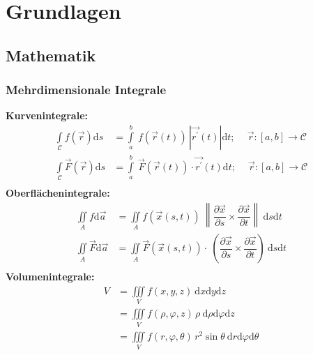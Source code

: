 		\begin{minipage}{.3\paperheight}
			\maketitle
			\tableofcontents
		\end{minipage}
		\section{Grundlagen}
		\subsection{Mathematik}
		\subsubsection{Mehrdimensionale Integrale}
		\begin{center}
			\textbf{Kurvenintegrale:}\\%
			\begin{align*}
				\int\limits_{\mathcal{C}}f(\vec{r})\mathrm{d}s &= \int\limits_a^b\ f(\vec{r}(t))\,|\vec{r^{\prime}}(t)|\mathrm{d}t;\
				\quad \vec{r}:[a,b]\to\mathcal{C}\\
				\int\limits_{\mathcal{C}}\vec{F}(\vec{r})\mathrm{d}s &= \int\limits_a^b\ \vec{F}(\vec{r}(t))\cdot\vec{r^{\prime}}(t)\mathrm{d}t;\
				\quad \vec{r}:[a,b]\to\mathcal{C}\\
			\end{align*}
			\textbf{Oberflächenintegrale:}
			\begin{align*}
				\iint\limits_A f \mathrm{d}\vec{a} &= \iint\limits_A f(\vec{x}(s,t))\!\
				\left\|\dfrac{\partial\vec{x}}{\partial s}\times\dfrac{\partial\vec{x}}{\partial t}\right\|\
				\mathrm{d}s\mathrm{d}t\\
				\iint\limits_A \vec{F} \mathrm{d}\vec{a} &= \iint\limits_A \vec{F}(\vec{x}(s,t))\cdot\!\
				\left( \dfrac{\partial\vec{x}}{\partial s}\times\dfrac{\partial\vec{x}}{\partial t} \right)\
				\!\mathrm{d}s\mathrm{d}t\\
			\end{align*}
			\textbf{Volumenintegrale:}
			\begin{align*}
				V &= \iiint\limits_V f(x,y,z)\:\mathrm{d}x\mathrm{d}y\mathrm{d}z\\
				&= \iiint\limits_V f(\rho,\varphi,z)\,\rho\:\mathrm{d}\rho\mathrm{d}\varphi\mathrm{d}z\\
				&= \iiint\limits_V f(r,\varphi,\theta)\,r^2\sin\theta\:\mathrm{d}r\mathrm{d}\varphi\mathrm{d}\theta\\
			\end{align*}
		\end{center}
